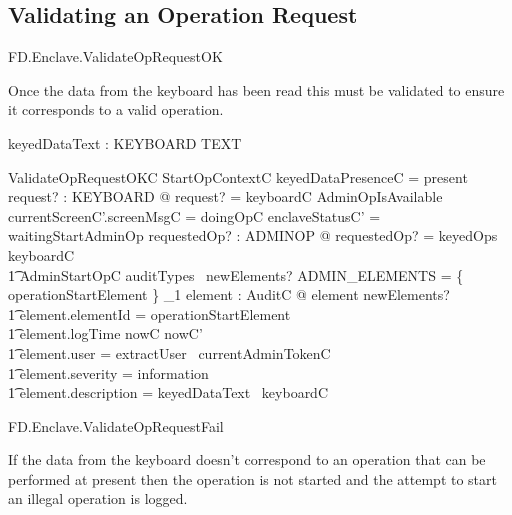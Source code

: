 \subsection{Validating an Operation Request}

\begin{traceunit}{FD.Enclave.ValidateOpRequestOK}
\end{traceunit}

Once the data from the keyboard has been read this must be validated
to ensure it corresponds to a valid operation.

\begin{axdef}
        keyedDataText : KEYBOARD \fun TEXT
\end{axdef}

\begin{schema}{ValidateOpRequestOKC}
        StartOpContextC
\where
        keyedDataPresenceC = present
\\      \exists request? : KEYBOARD @ request? = keyboardC \land
AdminOpIsAvailable 
\also
        currentScreenC'.screenMsgC = doingOpC
\also
        enclaveStatusC' = waitingStartAdminOp
\also
        \exists requestedOp? : ADMINOP @ requestedOp? = keyedOps \inv
        keyboardC 
\\ \t1  \land AdminStartOpC 
\also
        auditTypes~ newElements? \cap ADMIN\_ELEMENTS = 
        \{ operationStartElement \} 
\also
        \exists_1 element : AuditC @ element \in newElements? 
\\ \t1  \land element.elementId = operationStartElement
\\ \t1  \land element.logTime \in nowC \upto nowC'
\\ \t1  \land element.user = extractUser~ currentAdminTokenC
\\ \t1  \land element.severity = information
\\ \t1  \land element.description = keyedDataText~ keyboardC
\end{schema}

\begin{traceunit}{FD.Enclave.ValidateOpRequestFail}
\end{traceunit}


If the data from the keyboard doesn't correspond to an operation that
can be performed at present then the operation is not started and the
attempt to start an illegal operation is logged.

